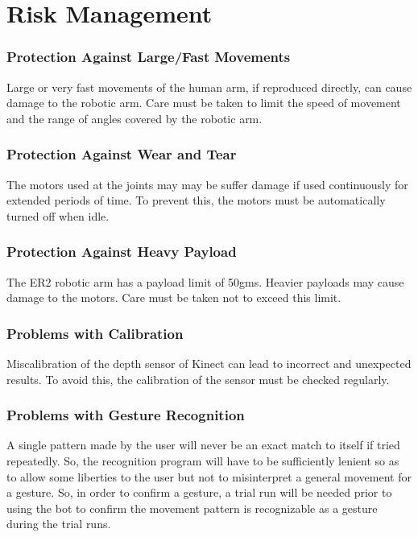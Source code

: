 \documentclass[a4wide]{scrreprt}
\begin{document}
\chapter{Risk Management}
\subsection*{Protection Against Large/Fast Movements}
Large or very fast movements of the human arm, if reproduced directly, can cause damage to the robotic arm. Care must be taken to limit the speed of movement and the range of angles covered by the robotic arm.

\subsection*{Protection Against Wear and Tear}
The motors used at the joints may may be suffer damage if used continuously for extended periods of time. To prevent this, the motors must be automatically turned off when idle.

\subsection*{Protection Against Heavy Payload}
The ER2 robotic arm has a payload limit of 50gms. Heavier payloads may cause damage to the motors. Care must be taken not to exceed this limit.

\subsection*{Problems with Calibration}
Miscalibration of the depth sensor of Kinect can lead to incorrect and unexpected results. To avoid this, the calibration of the sensor must be checked regularly.

\subsection*{Problems with Gesture Recognition}
A single pattern made by the user will never be an exact match to itself
if tried repeatedly. So, the recognition program will have to be sufficiently lenient so as to allow some liberties to the user but not to misinterpret a general movement for a gesture. So, in order to confirm a gesture, a trial run will be needed prior to using the bot to confirm the movement pattern is recognizable as a gesture during the trial runs.

\end{document}
